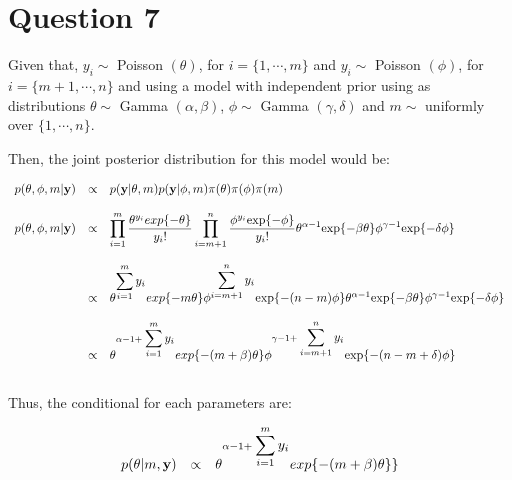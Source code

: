 \documentclass{article}
\begin{document}
\section{Question 7}

Given that, $y_{i} \sim $ Poisson $(\theta)$, for $i= \{1, \cdots, m\}$ and $y_{i} \sim $ Poisson $(\phi)$, for $i=\{m+1, \cdots, n\}$ and using a model with independent prior using as distributions $\theta \sim $ Gamma $(\alpha,\beta)$, $\phi \sim $ Gamma $(\gamma,\delta)$ and $m \sim$ uniformly over $\{1, \cdots, n\}$.

Then, the joint posterior distribution for this model would be:

\begin{equation*}
\begin{array}{lcl ll }

p(\theta,\phi, m|\textbf{y}) & \propto & p(\textbf{y}|\theta, m) p(\textbf{y}|\phi, m) \pi(\theta)\pi(\phi)\pi(m) \\ \\

p(\theta,\phi, m|\textbf{y}) & \propto & \displaystyle\prod_{i=1}^{m}\dfrac{\theta^{y_i}exp\{-\theta\}}{y_{i}!}\displaystyle\prod_{i=m+1}^{n}\dfrac{\phi^{y_i}\mbox{exp}\{-\phi\}}{y_{i}!} \theta^{\alpha-1}\mbox{exp}\{-\beta\theta \}\phi^{\gamma-1}\mbox{exp}\{-\delta\phi \} \\ \\

& \propto & \theta^{\displaystyle\sum_{i=1}^{m}{y_i}}exp\{-m\theta\}\phi^{\displaystyle\sum_{i=m+1}^{n}y_i}\mbox{exp}\{-(n-m)\phi\} \theta^{\alpha-1}\mbox{exp}\{-\beta\theta \}\phi^{\gamma-1}\mbox{exp}\{-\delta\phi \} \\ \\

& \propto & \theta^{\alpha -1 + \displaystyle\sum_{i=1}^{m}{y_i}}exp\{-(m + \beta)\theta\}\phi^{\gamma -1 + \displaystyle\sum_{i=m+1}^{n}y_i}\mbox{exp}\{-(n-m + \delta)\phi\} \\ \\

 \end{array}
\end{equation*}

Thus, the conditional for each parameters are:

\begin{equation*}
\begin{array}{lcl ll }

p(\theta | m,\textbf{y}) & \propto & \theta^{\alpha -1 + \displaystyle\sum_{i=1}^{m}{y_i}}exp\{-(m + \beta)\theta\}\} \\ 

 \end{array}
\end{equation*}
\end{document}
